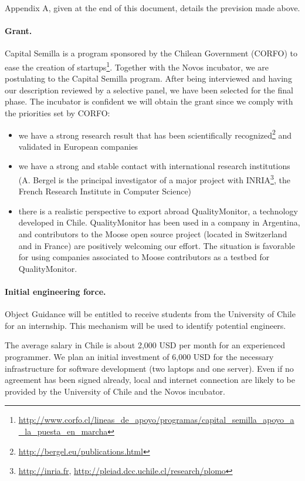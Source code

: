 \documentclass[runningheads]{llncs}
\begin{document}
Appendix A, given at the end of this document, details the prevision made above.

\paragraph{Grant.} Capital Semilla is a program sponsored by the Chilean Government (CORFO) to ease the creation of startups\footnote{\url{http://www.corfo.cl/lineas_de_apoyo/programas/capital_semilla_apoyo_a_la_puesta_en_marcha}}. Together with the Novos incubator, we are postulating to the Capital Semilla program. After being interviewed and having our description reviewed by a selective panel, we have been selected for the final phase. The incubator is confident we will obtain the grant since we comply with the priorities set by CORFO: 

\begin{itemize}
\item we have a strong research result that has been scientifically recognized\footnote{\url{http://bergel.eu/publications.html}} and validated in European companies
\item we have a strong and stable contact with international research institutions (A. Bergel is the principal investigator of a major project with INRIA\footnote{\url{http://inria.fr}, \url{http://pleiad.dcc.uchile.cl/research/plomo}}, the French Research Institute in Computer Science)
\item there is a realistic perspective to export abroad QualityMonitor, a technology developed in Chile. QualityMonitor has been used in a company in Argentina, and contributors to the Moose open source project (located in Switzerland and in France) are positively welcoming our effort. The situation is favorable for using companies associated to Moose contributors as a testbed for QualityMonitor.
\end{itemize}

\paragraph{Initial engineering force.} Object Guidance will be entitled to receive students from the University of Chile for an internship. This mechanism will be used to identify potential engineers.

The average salary in Chile is about 2,000 USD per month for an experienced programmer. We plan an initial investment of 6,000 USD for the necessary infrastructure for software development (two laptops and one server). Even if no agreement has been signed already, local and internet connection are likely to be provided by the University of Chile and the Novos incubator. 
\end{document}

